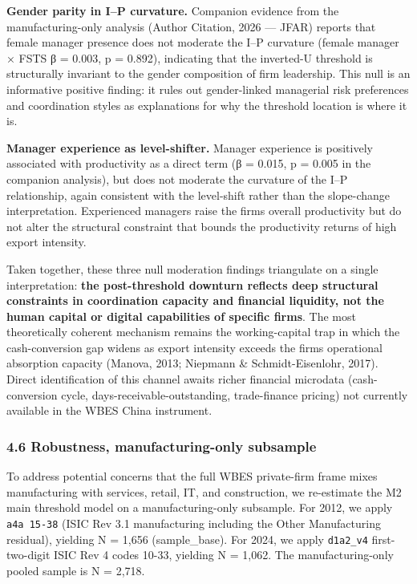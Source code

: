 \documentclass[12pt,a4paper]{article}
\begin{document}
\textbf{Gender parity in I--P curvature.} Companion evidence from the
manufacturing-only analysis (Author Citation, 2026 --- JFAR) reports
that female manager presence does not moderate the I--P curvature
(female manager × FSTS β = 0.003, p = 0.892), indicating that the
inverted-U threshold is structurally invariant to the gender composition
of firm leadership. This null is an informative positive finding: it
rules out gender-linked managerial risk preferences and coordination
styles as explanations for why the threshold location is where it is.

\textbf{Manager experience as level-shifter.} Manager experience is
positively associated with productivity as a direct term (β = 0.015, p =
0.005 in the companion analysis), but does not moderate the curvature of
the I--P relationship, again consistent with the level-shift rather than
the slope-change interpretation. Experienced managers raise the
firm\textquotesingle s overall productivity but do not alter the
structural constraint that bounds the productivity returns of high
export intensity.

Taken together, these three null moderation findings triangulate on a
single interpretation: \textbf{the post-threshold downturn reflects deep
structural constraints in coordination capacity and financial liquidity,
not the human capital or digital capabilities of specific firms}. The
most theoretically coherent mechanism remains the working-capital trap
in which the cash-conversion gap widens as export intensity exceeds the
firm\textquotesingle s operational absorption capacity (Manova, 2013;
Niepmann \& Schmidt-Eisenlohr, 2017). Direct identification of this
channel awaits richer financial microdata (cash-conversion cycle,
days-receivable-outstanding, trade-finance pricing) not currently
available in the WBES China instrument.

\hypertarget{46-robustness-manufacturing-only-subsample}{%
\subsubsection{4.6 Robustness, manufacturing-only
subsample}\label{46-robustness-manufacturing-only-subsample}}

To address potential concerns that the full WBES private-firm frame
mixes manufacturing with services, retail, IT, and construction, we
re-estimate the M2 main threshold model on a manufacturing-only
subsample. For 2012, we apply \texttt{a4a\ 15-38} (ISIC Rev 3.1
manufacturing including the Other Manufacturing residual), yielding N =
1,656 (sample\_base). For 2024, we apply \texttt{d1a2\_v4}
first-two-digit ISIC Rev 4 codes 10-33, yielding N = 1,062. The
manufacturing-only pooled sample is N = 2,718.
\end{document}
